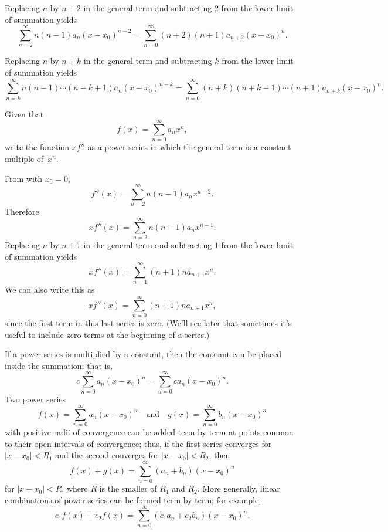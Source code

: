 \begin{alistSolution}
\item Replacing $n$ by $n+2$ in the general term
and subtracting $2$ from the lower limit of summation yields
\[
\sum_{n=2}^\infty n(n-1)a_n(x-x_0)^{n-2}=
\sum_{n=0}^\infty (n+2)(n+1)a_{n+2}(x-x_0)^n.
\]

\item Replacing $n$ by $n+k$ in the general term
and subtracting $k$ from the lower limit of summation yields
\[
\sum_{n=k}^\infty
n(n-1)\cdots(n-k+1)a_n(x-x_0)^{n-k}=
\sum_{n=0}^\infty (n+k)(n+k-1)\cdots(n+1)a_{n+k}(x-x_0)^n.
\]
\end{alistSolution}

\begin{example}\label{example:7.1.4}
Given that
\[
f(x)=\sum_{n=0}^\infty a_nx^n,
\]
write the function $xf''$  as a power series in which the general term
is a  constant multiple of~$x^n$.
\end{example}

\begin{solution}
From  with $x_0=0$,
\[
f''(x)=\sum_{n=2}^\infty n(n-1)a_nx^{n-2}.
\]
Therefore
\[
xf''(x)=\sum_{n=2}^\infty n(n-1)a_nx^{n-1}.
\]
Replacing $n$ by $n+1$ in the general term and  subtracting $1$
from the lower limit of summation yields
\[
xf''(x)=\sum_{n=1}^\infty (n+1)na_{n+1}x^n.
\]
We can also write this as
\[
xf''(x)=\sum_{n=0}^\infty (n+1)na_{n+1}x^n,
\]
since the first term in this last series is zero.  (We'll see
later that  sometimes it's useful to include zero terms at the
beginning of a series.)
\end{solution}



If a power series is multiplied by a constant, then the constant can be
placed inside the summation; that is,
\[
c\sum_{n=0}^\infty a_n(x-x_0)^n=\sum_{n=0}^\infty ca_n(x-x_0)^n.
\]
Two power series
\[
f(x)=\sum_{n=0}^\infty a_n(x-x_0)^n\quad\text{and}\quad
g(x)=\sum_{n=0}^\infty b_n(x-x_0)^n
\]
with positive radii of convergence can be added term by term at points
common to their open intervals of convergence;   thus, if the first
series converges for $|x-x_0|<R_1$ and the second converges for
$|x-x_0|<R_2$, then
\[
f(x)+g(x)=\sum_{n=0}^\infty(a_n+b_n)(x-x_0)^n
\]
for $|x-x_0|<R$, where $R$ is the smaller of $R_1$ and $R_2$.
More generally, linear combinations of power series can be formed term
by term;   for example,
\[
c_1f(x)+c_2f(x)=\sum_{n=0}^\infty(c_1a_n+c_2b_n)(x-x_0)^n.
\]

